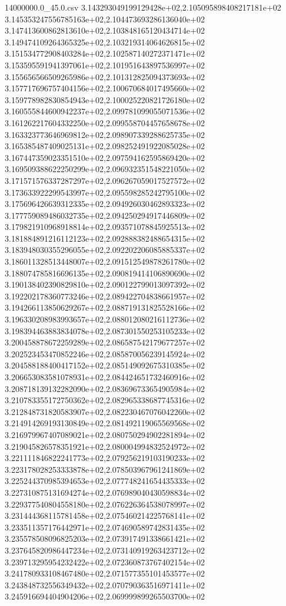 \begin{filecontents*}{14000000.0_45.0.csv}
3.143293049199129428e+02,2.105095898408217181e+02
3.145353247556785163e+02,2.104473693286136040e+02
3.147413600862813610e+02,2.103848165120434714e+02
3.149474109264365325e+02,2.103219314064626815e+02
3.151534772908403284e+02,2.102587140272371471e+02
3.153595591941397061e+02,2.101951643897536997e+02
3.155656566509265986e+02,2.101312825094373693e+02
3.157717696757404156e+02,2.100670684017495660e+02
3.159778982830854943e+02,2.100025220821726180e+02
3.160555844600942237e+02,2.099781099055071536e+02
3.161262217604332250e+02,2.099558704457658678e+02
3.163323773646969812e+02,2.098907339288625735e+02
3.165385487409025131e+02,2.098252491922085028e+02
3.167447359023351510e+02,2.097594162595869420e+02
3.169509388622250299e+02,2.096932351548221050e+02
3.171571576337287297e+02,2.096267059017527572e+02
3.173633922299543997e+02,2.095598285242795100e+02
3.175696426639312335e+02,2.094926030462893323e+02
3.177759089486032735e+02,2.094250294917446809e+02
3.179821910968918814e+02,2.093571078845925513e+02
3.181884891216112123e+02,2.092888382488654315e+02
3.183948030355296055e+02,2.092202206085885337e+02
3.186011328513448007e+02,2.091512549878261780e+02
3.188074785816696135e+02,2.090819414106890690e+02
3.190138402390829810e+02,2.090122799013097392e+02
3.192202178360773246e+02,2.089422704838661957e+02
3.194266113850629267e+02,2.088719131825528166e+02
3.196330208983993657e+02,2.088012080216112736e+02
3.198394463883834078e+02,2.087301550253105233e+02
3.200458878672259289e+02,2.086587542179677257e+02
3.202523453470852246e+02,2.085870056239145924e+02
3.204588188400417152e+02,2.085149092675310385e+02
3.206653083581078931e+02,2.084424651732460916e+02
3.208718139132282090e+02,2.083696733654905984e+02
3.210783355172750362e+02,2.082965338687745316e+02
3.212848731820583907e+02,2.082230467076042260e+02
3.214914269193130849e+02,2.081492119065569568e+02
3.216979967407089021e+02,2.080750294902281894e+02
3.219045826578351921e+02,2.080004994832524972e+02
3.221111846822241773e+02,2.079256219103190233e+02
3.223178028253333878e+02,2.078503967961241869e+02
3.225244370985394653e+02,2.077748241654435333e+02
3.227310875131694274e+02,2.076989040430598834e+02
3.229377540804558180e+02,2.076226364538078997e+02
3.231444368115781458e+02,2.075460214225768141e+02
3.233511357176442971e+02,2.074690589742831435e+02
3.235578508096825203e+02,2.073917491338661421e+02
3.237645820986447234e+02,2.073140919263423712e+02
3.239713295954232422e+02,2.072360873767402154e+02
3.241780933108467480e+02,2.071577355101453577e+02
3.243848732556349432e+02,2.070790363516971411e+02
3.245916694404904206e+02,2.069999899265503700e+02

\end{filecontents*}
